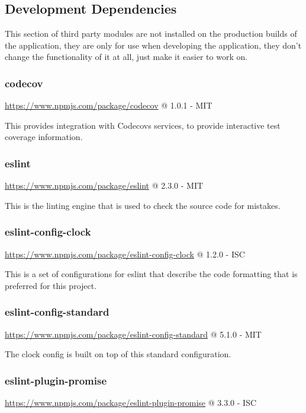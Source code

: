\subsection{Development Dependencies}
  This section of third party modules are not installed on the production builds of the application, they are only for use when developing the application, they don't change the functionality of it at all, just make it easier to work on. 

\subsubsection*{codecov} 

\url{https://www.npmjs.com/package/codecov} @ 1.0.1 - MIT

This provides integration with Codecovs services, to provide interactive test coverage information.

\subsubsection*{eslint}  

\url{https://www.npmjs.com/package/eslint} @ 2.3.0 - MIT

This is the linting engine that is used to check the source code for mistakes.

\subsubsection*{eslint-config-clock} 

\url{https://www.npmjs.com/package/eslint-config-clock} @ 1.2.0 - ISC

This is a set of configurations for eslint that describe the code formatting that is preferred for this project.

\subsubsection*{eslint-config-standard} 

\url{https://www.npmjs.com/package/eslint-config-standard} @ 5.1.0 - MIT

The clock config is built on top of this standard configuration.

\subsubsection*{eslint-plugin-promise} 

\url{https://www.npmjs.com/package/eslint-plugin-promise} @ 3.3.0 - ISC


